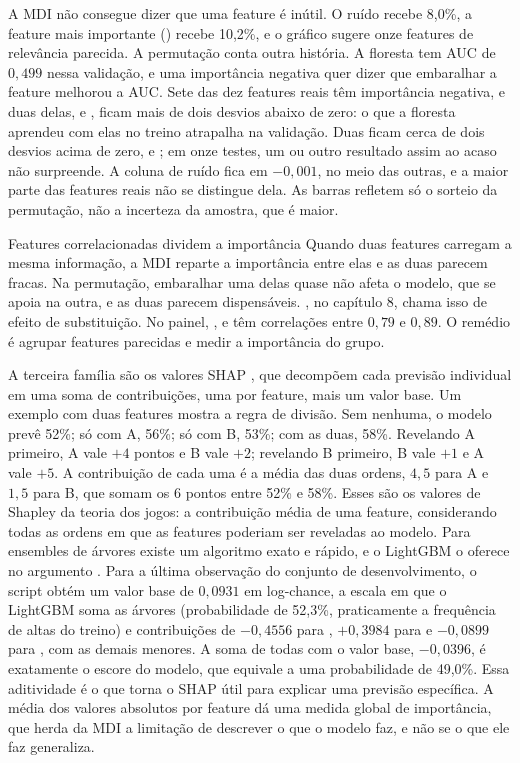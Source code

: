 A MDI não consegue dizer que uma feature é inútil. O ruído recebe 8,0\%, a feature mais importante () recebe 10,2\%, e o gráfico sugere onze features de relevância parecida. A permutação conta outra história. A floresta tem AUC de $0,499$ nessa validação, e uma importância negativa quer dizer que embaralhar a feature melhorou a AUC. Sete das dez features reais têm importância negativa, e duas delas,  e , ficam mais de dois desvios abaixo de zero: o que a floresta aprendeu com elas no treino atrapalha na validação. Duas ficam cerca de dois desvios acima de zero,  e ; em onze testes, um ou outro resultado assim ao acaso não surpreende. A coluna de ruído fica em $-0,001$, no meio das outras, e a maior parte das features reais não se distingue dela. As barras refletem só o sorteio da permutação, não a incerteza da amostra, que é maior.

\begin{armadilha}{Features correlacionadas dividem a importância}
Quando duas features carregam a mesma informação, a MDI reparte a importância entre elas e as duas parecem fracas. Na permutação, embaralhar uma delas quase não afeta o modelo, que se apoia na outra, e as duas parecem dispensáveis. \citet{lopezdeprado2018}, no capítulo 8, chama isso de efeito de substituição. No painel, ,  e  têm correlações entre $0,79$ e $0,89$. O remédio é agrupar features parecidas e medir a importância do grupo.
\end{armadilha}

A terceira família são os valores SHAP \citep{lundberg2017}, que decompõem cada previsão individual em uma soma de contribuições, uma por feature, mais um valor base. Um exemplo com duas features mostra a regra de divisão. Sem nenhuma, o modelo prevê 52\%; só com A, 56\%; só com B, 53\%; com as duas, 58\%. Revelando A primeiro, A vale $+4$ pontos e B vale $+2$; revelando B primeiro, B vale $+1$ e A vale $+5$. A contribuição de cada uma é a média das duas ordens, $4,5$ para A e $1,5$ para B, que somam os 6 pontos entre 52\% e 58\%. Esses são os valores de Shapley da teoria dos jogos: a contribuição média de uma feature, considerando todas as ordens em que as features poderiam ser reveladas ao modelo. Para ensembles de árvores existe um algoritmo exato e rápido, e o LightGBM o oferece no argumento . Para a última observação do conjunto de desenvolvimento, o script  obtém um valor base de $0,0931$ em log-chance, a escala em que o LightGBM soma as árvores (probabilidade de 52,3\%, praticamente a frequência de altas do treino) e contribuições de $-0,4556$ para , $+0,3984$ para  e $-0,0899$ para , com as demais menores. A soma de todas com o valor base, $-0,0396$, é exatamente o escore do modelo, que equivale a uma probabilidade de 49,0\%. Essa aditividade é o que torna o SHAP útil para explicar uma previsão específica. A média dos valores absolutos por feature dá uma medida global de importância, que herda da MDI a limitação de descrever o que o modelo faz, e não se o que ele faz generaliza.

